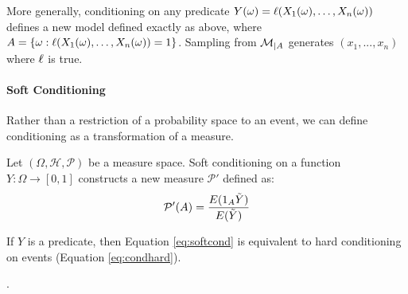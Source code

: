 More generally, conditioning on any predicate $Y(\omega) = \operatorname{\ell}(X_1(\omega), \dots, X_n(\omega))$
defines a new model defined exactly as above, where $A = \{\omega : \operatorname{\ell}(X_1(\omega), \dots, X_n(\omega)) = 1\}$.
Sampling from ${\cal M}_{|A}$ generates $(x_1, ..., x_n)$ where $\operatorname{\ell}$ is true.


\paragraph{Soft Conditioning}
Rather than a restriction of a probability space to an event, we can define conditioning as a transformation of a measure.

\begin{definition}Let $(\Omega, \mathcal{H}, \mathcal{P})$ be a measure space.
Soft conditioning on a function $Y: \Omega \to [0, 1]$ constructs a new measure $\mathcal{P}'$ defined as:
\begin{equation}\label{eq:softcond}
\mathcal{P}'(A) = \frac{E(1_A\tilde{Y})}{E(\tilde{Y})}
\end{equation}

If $Y$ is a predicate, then Equation \ref{eq:softcond} is equivalent to hard conditioning on events (Equation \ref{eq:condhard}).
\end{definition}.



